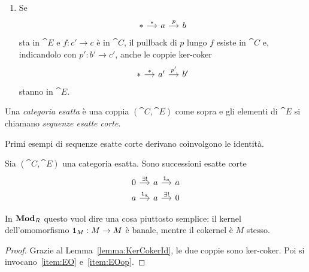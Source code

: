 \begin{definition}
\begin{enumerate}[leftmargin=*, label=(E\arabic*),
    ref=Definizione~\ref{definition:CategorieEsatte}-E\arabic*]
\[\begin{tikzcd}[column sep=small]
        a \ar["{i}", r] & b \ar["{\ast}", r] & \ast
      \end{tikzcd}
    \]
    sta in \(\cat E\) e \(f : a \to a'\) è in \(\cat C\), il pushout di
    \(i\) lungo \(f\) esiste in \(\cat C\) e, indicandolo con
    \(i' : a' \to b'\), anche le coppie ker-coker
    \[
      \begin{tikzcd}[column sep=small]
        a' \ar["{i'}", r] & b' \ar["{\ast}", r] & \ast
      \end{tikzcd}
    \]
    stanno in \(\cat E\).
  \item \label{item:E2op} Se
    \[
      \begin{tikzcd}[column sep=small]
        \ast \ar["{\ast}", r] & a \ar["{p}", r] & b
      \end{tikzcd}
    \]
    sta in \(\cat E\) e \(f : c' \to c\) è in \(\cat C\), il pullback di
    \(p\) lungo \(f\) esiste in \(\cat C\) e, indicandolo con
    \(p' : b' \to c'\), anche le coppie ker-coker
    \[
      \begin{tikzcd}[column sep=small]
        \ast \ar["{\ast}", r] & a' \ar["{p'}", r] & b'
      \end{tikzcd}
    \]
    stanno in \(\cat E\).
  \end{enumerate}
  Una {\em categoria esatta} è una coppia \((\cat C,\cat E)\) come
  sopra e gli elementi di \(\cat E\) si chiamano {\em sequenze esatte
    corte}.
\end{definition}

Primi esempi di sequenze esatte corte derivano coinvolgono le
identità.

\begin{proposition}\label{proposition:ExactId}
  Sia \((\cat C,\cat E)\) una categoria esatta. Sono successioni
  esatte corte
  \[
    \begin{tikzcd}[row sep=tiny, column sep=small]
      0 \ar["{\exists!}", r] & a \ar["{\id_a}", r] & a \\
      a \ar["{\id_a}", r] & a \ar["{\exists!}", r] & 0
    \end{tikzcd}
  \]
\end{proposition}

In \(\mathbf{Mod}_R\) questo vuol dire una cosa piuttosto semplice: il kernel
dell'omomorfismo \(\mathtt 1_M : M \to M\) è banale, mentre il cokernel è
\(M\) stesso.

\begin{proof}
  Grazie al Lemma~\ref{lemma:KerCokerId}, le due coppie sono
  ker-coker. Poi si invocano~\ref{item:EO} e~\ref{item:EOop}.
\end{proof}


